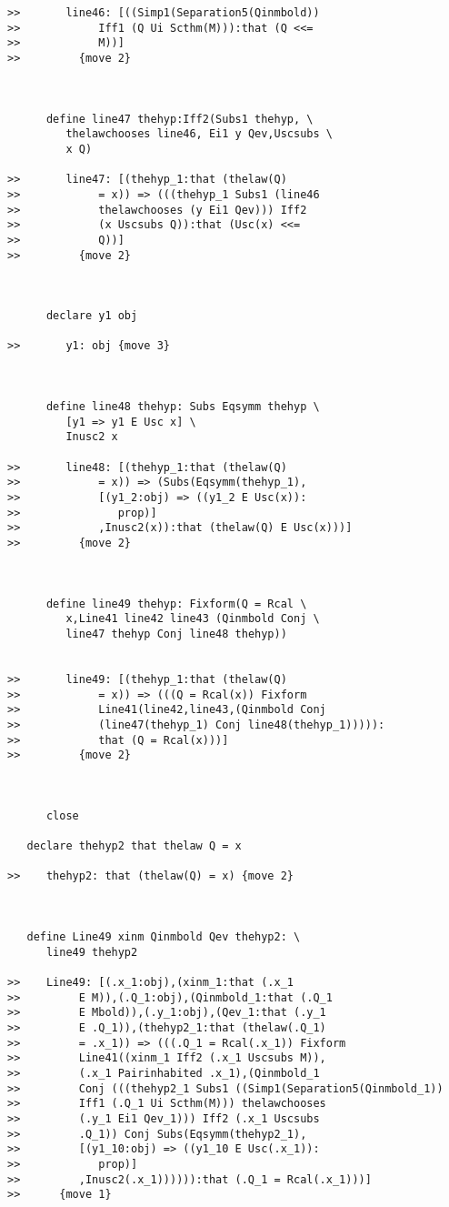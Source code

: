 \documentclass[12pt]{article}
\begin{document}
\begin{verbatim}
>>       line46: [((Simp1(Separation5(Qinmbold))
>>            Iff1 (Q Ui Scthm(M))):that (Q <<=
>>            M))]
>>         {move 2}



      define line47 thehyp:Iff2(Subs1 thehyp, \
         thelawchooses line46, Ei1 y Qev,Uscsubs \
         x Q)

>>       line47: [(thehyp_1:that (thelaw(Q)
>>            = x)) => (((thehyp_1 Subs1 (line46
>>            thelawchooses (y Ei1 Qev))) Iff2
>>            (x Uscsubs Q)):that (Usc(x) <<=
>>            Q))]
>>         {move 2}



      declare y1 obj

>>       y1: obj {move 3}



      define line48 thehyp: Subs Eqsymm thehyp \
         [y1 => y1 E Usc x] \
         Inusc2 x

>>       line48: [(thehyp_1:that (thelaw(Q)
>>            = x)) => (Subs(Eqsymm(thehyp_1),
>>            [(y1_2:obj) => ((y1_2 E Usc(x)):
>>               prop)]
>>            ,Inusc2(x)):that (thelaw(Q) E Usc(x)))]
>>         {move 2}



      define line49 thehyp: Fixform(Q = Rcal \
         x,Line41 line42 line43 (Qinmbold Conj \
         line47 thehyp Conj line48 thehyp))


>>       line49: [(thehyp_1:that (thelaw(Q)
>>            = x)) => (((Q = Rcal(x)) Fixform
>>            Line41(line42,line43,(Qinmbold Conj
>>            (line47(thehyp_1) Conj line48(thehyp_1))))):
>>            that (Q = Rcal(x)))]
>>         {move 2}



      close

   declare thehyp2 that thelaw Q = x

>>    thehyp2: that (thelaw(Q) = x) {move 2}



   define Line49 xinm Qinmbold Qev thehyp2: \
      line49 thehyp2

>>    Line49: [(.x_1:obj),(xinm_1:that (.x_1
>>         E M)),(.Q_1:obj),(Qinmbold_1:that (.Q_1
>>         E Mbold)),(.y_1:obj),(Qev_1:that (.y_1
>>         E .Q_1)),(thehyp2_1:that (thelaw(.Q_1)
>>         = .x_1)) => (((.Q_1 = Rcal(.x_1)) Fixform
>>         Line41((xinm_1 Iff2 (.x_1 Uscsubs M)),
>>         (.x_1 Pairinhabited .x_1),(Qinmbold_1
>>         Conj (((thehyp2_1 Subs1 ((Simp1(Separation5(Qinmbold_1))
>>         Iff1 (.Q_1 Ui Scthm(M))) thelawchooses
>>         (.y_1 Ei1 Qev_1))) Iff2 (.x_1 Uscsubs
>>         .Q_1)) Conj Subs(Eqsymm(thehyp2_1),
>>         [(y1_10:obj) => ((y1_10 E Usc(.x_1)):
>>            prop)]
>>         ,Inusc2(.x_1)))))):that (.Q_1 = Rcal(.x_1)))]
>>      {move 1}




\end{verbatim}
\end{document}

